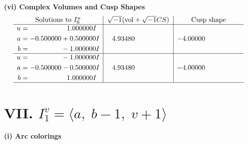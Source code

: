 \documentclass[1p]{elsarticle_modified}
\theoremstyle{definition}
\newcommand{\I}{\sqrt{-1}}
\begin{document}
\newpage\flushleft \textbf{(vi) Complex Volumes and Cusp Shapes}
$$\begin{array}{c|c|c}  
\text{Solutions to }I^u_{6}& \I (\text{vol} + \sqrt{-1}CS) & \text{Cusp shape}\\
 \hline 
\begin{aligned}
u &= \phantom{-0.000000 -}1.000000 I \\
a &= -0.500000 + 0.500000 I \\
b &= \phantom{-0.000000 } -1.000000 I\end{aligned}
 & \phantom{-}4.93480\phantom{ +0.000000I} & -4.00000\phantom{ +0.000000I} \\ \hline\begin{aligned}
u &= \phantom{-0.000000 } -1.000000 I \\
a &= -0.500000 - 0.500000 I \\
b &= \phantom{-0.000000 -}1.000000 I\end{aligned}
 & \phantom{-}4.93480\phantom{ +0.000000I} & -4.00000\phantom{ +0.000000I}\\
 \hline 
 \end{array}$$\newpage\newpage\renewcommand{\arraystretch}{1}
\centering \section*{VII. $I^v_{1}= \langle a,\;b-1,\;v+1 \rangle$}
\flushleft \textbf{(i) Arc colorings}\\
\end{document}
